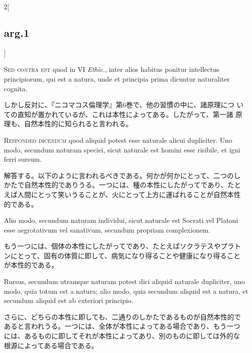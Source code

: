 \documentclass[paper=a4paper,fontsize=10pt,jafontsize=9pt,titlepage]{jlreq}
\begin{document}
\begin{paracol}{2}[\subsection{arg.1}]
\switchcolumn*[\subsection{s.c.}]

{\scshape Sed contra est} quod in VI {\itshape Ethic}., inter alios
habitus ponitur intellectus principiorum, qui est a natura, unde et
principia prima dicuntur naturaliter cognita.

\switchcolumn

しかし反対に、『ニコマコス倫理学』第6巻で、他の習慣の中に、諸原理につ
いての直知が置かれているが、これは本性によってある。したがって、第一諸
原理も、自然本性的に知られると言われる。


{\scshape Respondeo dicendum} quod aliquid potest esse naturale alicui
dupliciter. Uno modo, secundum naturam speciei, sicut naturale est
homini esse risibile, et igni ferri sursum.

\switchcolumn

解答する。以下のように言われるべきである。何かが何かにとって、二つのし
かたで自然本性的でありうる。一つには、種の本性にしたがってであり、たと
えば人間にとって笑いうることが、火にとって上方に運ばれることが自然本性
的である。

\switchcolumn*

Alio modo, secundum naturam individui, sicut naturale est Socrati vel
Platoni esse aegrotativum vel sanativum, secundum propriam
complexionem.

\switchcolumn

もう一つには、個体の本性にしたがってであり、たとえばソクラテスやプラト
ンにとって、固有の体質に即して、病気になり得ることや健康になり得ること
が本性的である。

\switchcolumn*

Rursus, secundum utramque naturam potest dici aliquid naturale
dupliciter, uno modo, quia totum est a natura; alio modo, quia
secundum aliquid est a natura, et secundum aliquid est ab exteriori
principio.

\switchcolumn

さらに、どちらの本性に即しても、二通りのしかたであるものが自然本性的で
あると言われうる。一つには、全体が本性によってある場合であり、もう一つ
には、あるものに即してそれが本性によってあり、別のものに即しては外的な
根源によってある場合である。


\end{paracol}
\end{document}
